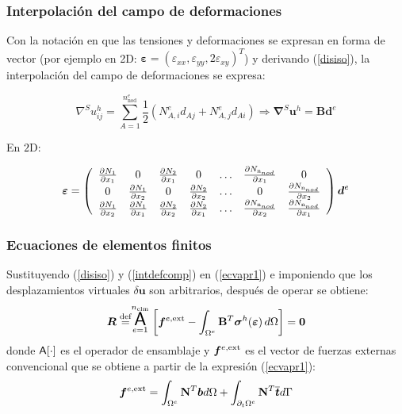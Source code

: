 \documentclass{beamer}
\begin{document}
\begin{frame}
\frametitle{Interpolación del campo de deformaciones}

Con la notación en que las tensiones y
deformaciones se expresan en forma de vector (por ejemplo en 2D:
$\bm{\varepsilon}=(\varepsilon_{xx},\varepsilon_{yy},2
\varepsilon_{xy})^T$) y derivando (\ref{disiso}), la interpolación del campo
de deformaciones se expresa:
\begin{small}
\begin{equation}
\nabla^S u^h_{ij}=\sum_{A=1}^{n^e_{\textrm{nod}}}
\frac{1}{2}\left(N^e_{A,i} d_{Aj}+N^e_{A,j} d_{Ai}
\right) \Rightarrow
\bm{\nabla}^{S}\bm{u}^h=\mathbf{B} \bm{d}^e \label{intdefcomp}
\end{equation}
\end{small}
En $2$D:
\begin{small}
\begin{equation}
\bm{\varepsilon}=
\left(
\begin{array}{ccccccc}
\frac{\partial N_1}{\partial x_1} & 0 &\frac{\partial N_2}{\partial x_1} &0 &
\ldots & \frac{\partial N_{\textrm n_{nod}}}{\partial x_1} & 0 \\
0 & \frac{\partial N_1}{\partial x_2} & 0 &\frac{\partial N_2}{\partial x_2} &
\ldots & 0 & \frac{\partial N_{\textrm n_{nod}}}{\partial x_2} \\
\frac{\partial N_1}{\partial x_2} &\frac{\partial N_1}{\partial x_1} &
\frac{\partial N_2}{\partial x_2} &\frac{\partial N_2}{\partial x_1} &
\ldots & \frac{\partial N_{\textrm n_{nod}}}{\partial x_2} &\frac{\partial
N_{\textrm n_{nod}}}{\partial x_1}
\end{array}
\right)\bm{d}^e
\end{equation}
\end{small}
\end{frame}
\begin{frame}
\frametitle{Ecuaciones de elementos finitos}
Sustituyendo (\ref{disiso}) y (\ref{intdefcomp}) en (\ref{ecvapr1})
e imponiendo que los desplazamientos virtuales $\delta \bm{u}$ son arbitrarios,
después de operar se obtiene:
\begin{equation}
\bm{R}\stackrel{\textrm{def}}{=}\stackrel{n_{\textrm{elm}}}{
\underset{e=1}{\mbox{\LARGE{\bf {\sf A}}}}} \left[
\bm{f}^{e,{\rm ext}}-\int_{\Omega^e}
\mathbf{B}^{T} \bm{\sigma}^{h}(\bm{\varepsilon})
\,d\Omega \right] = \bm{0} \label{resmef1}
\end{equation}
donde ${\Large \bf{\sf A}[\cdot]}$ es el operador de ensamblaje y
$\bm{f}^{e,{\rm ext}}$
es el vector de fuerzas externas convencional que se obtiene a partir de la
expresión (\ref{ecvapr1}):
\begin{equation}
\bm{f}^{e,{\rm ext}}=\int_{\Omega^e} \mathbf{N}^{T} \bm{b} d\Omega+
\int_{\partial_t \Omega^e} \mathbf{N}^{T} \overline{\bm{t}} d \Gamma
\label{fexter}
\end{equation}
\end{frame}
\end{document}
